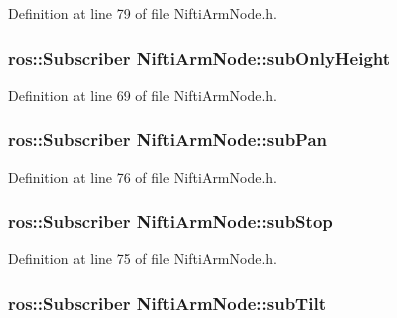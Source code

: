 \-Definition at line 79 of file \-Nifti\-Arm\-Node.\-h.

\subsubsection[{sub\-Only\-Height}]{\setlength{\rightskip}{0pt plus 5cm}ros\-::\-Subscriber {\bf \-Nifti\-Arm\-Node\-::sub\-Only\-Height}\hspace{0.3cm}{\ttfamily  [private]}}\label{classNiftiArmNode_ab535e2794424dd2131e5572cabbfc138}


\-Definition at line 69 of file \-Nifti\-Arm\-Node.\-h.

\subsubsection[{sub\-Pan}]{\setlength{\rightskip}{0pt plus 5cm}ros\-::\-Subscriber {\bf \-Nifti\-Arm\-Node\-::sub\-Pan}\hspace{0.3cm}{\ttfamily  [private]}}\label{classNiftiArmNode_a2e5e38c6210288e21c0e61eab971a0a2}


\-Definition at line 76 of file \-Nifti\-Arm\-Node.\-h.

\subsubsection[{sub\-Stop}]{\setlength{\rightskip}{0pt plus 5cm}ros\-::\-Subscriber {\bf \-Nifti\-Arm\-Node\-::sub\-Stop}\hspace{0.3cm}{\ttfamily  [private]}}\label{classNiftiArmNode_a63afc09b83ecabb18408cfaa3dd52ffc}


\-Definition at line 75 of file \-Nifti\-Arm\-Node.\-h.

\subsubsection[{sub\-Tilt}]{\setlength{\rightskip}{0pt plus 5cm}ros\-::\-Subscriber {\bf \-Nifti\-Arm\-Node\-::sub\-Tilt}\hspace{0.3cm}{\ttfamily  [private]}}\label{classNiftiArmNode_afdf4b1afeda5242eed448cbc6baadfd5}


